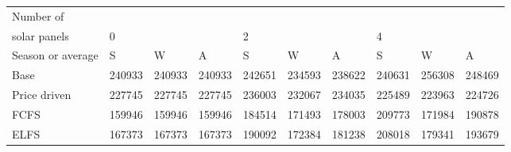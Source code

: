 \begin{table}[h] 
\centering 
\begin{tabular}{l|lll|lll|lll}Number of \\ solar panels&0& & &2& & &4& & \\ \hline 
Season or average & S & W & A & S & W & A & S & W & A \\ \hline 
Base&240933&240933&240933&242651&234593&238622&240631&256308&248469 \\ 
Price driven&227745&227745&227745&236003&232067&234035&225489&223963&224726 \\ 
FCFS&159946&159946&159946&184514&171493&178003&209773&171984&190878 \\ 
ELFS&167373&167373&167373&190092&172384&181238&208018&179341&193679 \\ 
\end{tabular} 
\end{table}